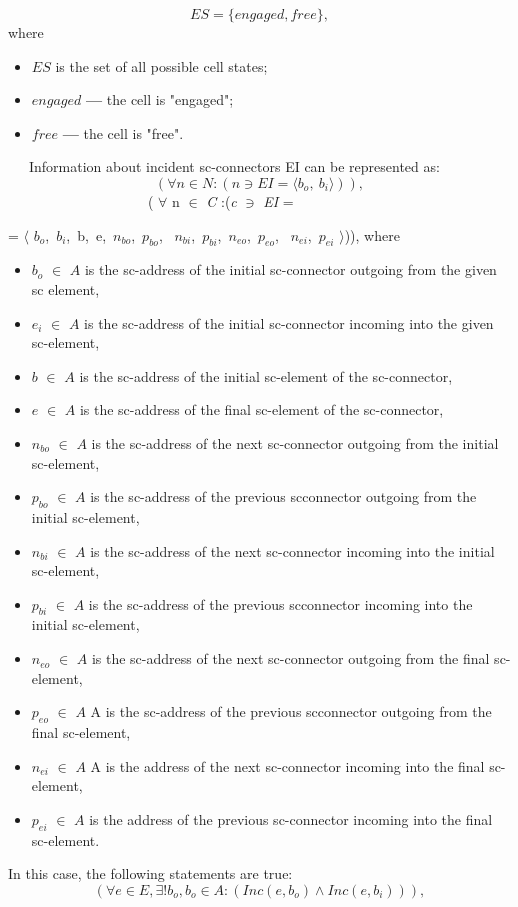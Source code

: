 \documentclass[10pt, a4paper, twocolumn]{article}
\begin{document}
\[
ES = \{ engaged, free \},
\]
where
\begin{itemize}[noitemsep,topsep=0pt,parsep=0pt,partopsep=0pt]
    \item $ES$ is the set of all possible cell states;
    \item $engaged$ \textbf{---} the cell is "engaged";
    \item $free$ \textbf{---} the cell is "free".
\end{itemize}
\par \ \ \ Information about incident sc-connectors EI can be
represented as:
\[
(\forall\textit{n} \in N : (n \ni EI = \langle b_{o}, \ b_{i} \rangle )),
\]
\ \ \ \ \ \ \ \ \ \ \ \ \ \ \ \ \ \ \ \  ( $\forall$ n $\in$ \textit{C} :(\textit{c} $\ni$ \textit{EI} = \par = $\langle$ $b_{o}$,\ $b_{i}$,\ b,\ e,\ $n_{bo}$,\ $p_{bo}$, \ $n_{bi}$,\ $p_{bi}$,\ $n_{eo}$,\ $p_{eo}$, \ $n_{ei}$,\ $p_{ei}$ $\rangle$)),
where
\begin{itemize}[noitemsep,topsep=0pt,parsep=0pt,partopsep=0pt]
    \item $b_{o}$ $\in$ $A$ is the sc-address of the initial sc-connector
outgoing from the given sc element,
    \item $e_{i}$ $\in$ $A$ is the sc-address of the initial sc-connector
incoming into the given sc-element,
    \item $b$ $\in$ $A$ is the sc-address of the initial sc-element of
the sc-connector,
    \item $e$ $\in$ $A$  is the sc-address of the final sc-element of
the sc-connector,
    \item  $n_{bo}$ $\in$ $A$ is the sc-address of the next sc-connector
outgoing from the initial sc-element,
    \item $p_{bo}$ $\in$ $A$ is the sc-address of the previous scconnector outgoing from the initial sc-element,
    \item  $n_{bi}$ $\in$ $A$ is the sc-address of the next sc-connector
incoming into the initial sc-element,
    \item  $p_{bi}$ $\in$ $A$ is the sc-address of the previous scconnector incoming into the initial sc-element,
    \item  $n_{eo}$ $\in$ $A$ is the sc-address of the next sc-connector
outgoing from the final sc-element,
    \item $p_{eo}$ $\in$ $A$ A is the sc-address of the previous scconnector outgoing from the final sc-element,
    \item $n_{ei}$ $\in$ $A$ A is the address of the next sc-connector
incoming into the final sc-element,
    \item $p_{ei}$ $\in$ $A$ is the address of the previous sc-connector
incoming into the final sc-element.
\end{itemize}
\par In this case, the following statements are true:
\[
(\forall e \in E, \exists !b_{o},b_{o} \in A : (Inc(e,b_{o}) \wedge Inc(e, b_{i}))),
\]
\end{document}
